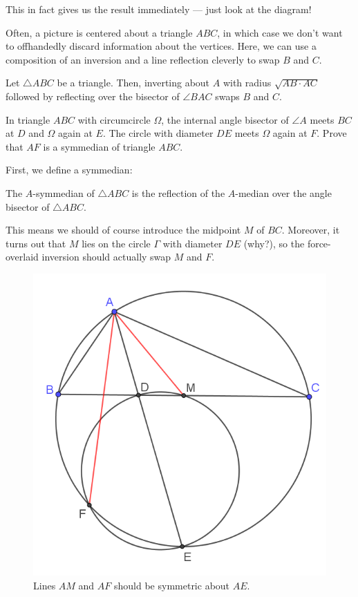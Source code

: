 \documentclass{scrartcl}
\begin{document}
This in fact gives us the result immediately ---
just look at the diagram!

\pagebreak

Often, a picture is centered about a triangle $ABC$,
in which case we don't want to offhandedly discard information
about the vertices. Here, we can use a composition of an inversion and
a line reflection cleverly to swap $B$ and $C$.

\begin{lemma}
	Let $\triangle ABC$ be a triangle. Then, inverting about $A$
	with radius $\sqrt{AB\cdot AC}$ followed by
	reflecting over the bisector of $\angle BAC$
	swaps $B$ and $C$.
\end{lemma}

\begin{problem}
	In triangle $ABC$ with circumcircle $\Omega$, the internal angle bisector
	of $\angle A$ meets $BC$ at $D$ and $\Omega$ again at $E$.
	The circle with diameter $DE$ meets $\Omega$ again at $F$.
	Prove that $AF$ is a symmedian of triangle $ABC$.
\end{problem}

First, we define a symmedian:
\begin{definition}
	The $A$-symmedian of $\triangle ABC$ is the reflection of
	the $A$-median over the angle bisector of $\triangle ABC$.
\end{definition}

This means we should of course introduce the midpoint $M$ of $BC$.
Moreover, it turns out that $M$ lies on the circle $\Gamma$ with diameter $DE$
(why?), so the force-overlaid inversion should actually swap $M$ and $F$.

\begin{figure}[h]
	\centering
	\includegraphics[width=0.6\linewidth]{rus2009_1}
	\caption{Lines $AM$ and $AF$ should be symmetric about $AE$.}
	\label{fig:rus20091}
\end{figure}
\end{document}
